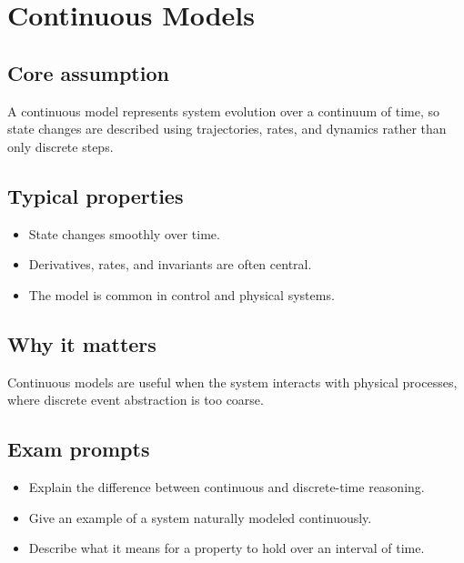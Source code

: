 \chapter{Continuous Models}

\section{Core assumption}
\begin{defbox}
A continuous model represents system evolution over a continuum of time, so state changes are described using trajectories, rates, and dynamics rather than only discrete steps.
\end{defbox}

\section{Typical properties}
\begin{itemize}
  \item State changes smoothly over time.
  \item Derivatives, rates, and invariants are often central.
  \item The model is common in control and physical systems.
\end{itemize}

\section{Why it matters}
\begin{keybox}
Continuous models are useful when the system interacts with physical processes, where discrete event abstraction is too coarse.
\end{keybox}

\section{Exam prompts}
\begin{itemize}
  \item Explain the difference between continuous and discrete-time reasoning.
  \item Give an example of a system naturally modeled continuously.
  \item Describe what it means for a property to hold over an interval of time.
\end{itemize}
